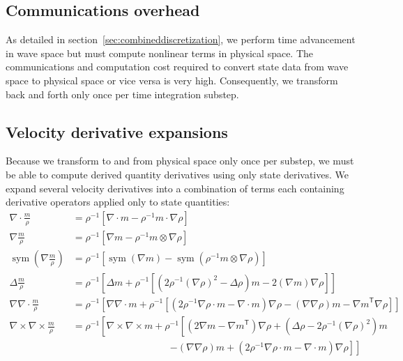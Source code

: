 \documentclass[letterpaper,11pt,nointlimits,reqno,draft]{amsart}
\newcommand{\trans}[1]{{#1}^{\ensuremath{\mathsf{T}}}}
\newcommand{\symmetricpart}[1]
  {\ensuremath{\operatorname{sym}\left(#1\right)}}
\begin{document}
\subsection{Communications overhead}
\label{sec:commoverhead}

As detailed in section~\ref{sec:combineddiscretization}, we perform time
advancement in wave space but must compute nonlinear terms in physical space.
The communications and computation cost required to convert state data from
wave space to physical space or vice versa is very high.  Consequently, we
transform back and forth only once per time integration substep.

\subsection{Velocity derivative expansions}
\label{velocity_derivative_expansions}

Because we transform to and from physical space only once per substep, we must
be able to compute derived quantity derivatives using only state derivatives.
We expand several velocity derivatives into a combination of terms each
containing derivative operators applied only to state quantities:
\begin{subequations}
\begin{align}
  \nabla\cdot\frac{m}{\rho}
  &=
  \rho^{-1}\left[ \nabla\cdot{}m - \rho^{-1}m\cdot\nabla\rho \right]
\\
  \nabla{}\frac{m}{\rho}
  &=
  \rho^{-1}\left[ \nabla{}m - \rho^{-1}{m}\otimes\nabla\rho  \right]
\\
  \symmetricpart{\nabla\frac{m}{\rho}}
  &=
  \rho^{-1}\left[
      \symmetricpart{\nabla{}m}
    - \symmetricpart{\rho^{-1}m\otimes\nabla\rho}
  \right]
\\
  \Delta\frac{m}{\rho}
  &=
 \rho^{-1}\left[
      \Delta{}m
    + \rho^{-1}\left[
          \left(
              2\rho^{-1}\left(\nabla\rho\right)^{2}
            - \Delta\rho
          \right) {m}
        - 2 \left(\nabla{}m\right)\nabla\rho
      \right]
 \right]
\\
  \nabla\nabla\cdot\frac{m}{\rho}
  &=
  \rho^{-1}\left[
        \nabla\nabla\cdot{}m
      + \rho^{-1}\left[
            \left(2\rho^{-1}\nabla\rho\cdot{}m-\nabla\cdot{}m\right)\nabla\rho
          - \left(\nabla\nabla\rho\right)m
          - \trans{\nabla{}m}\nabla\rho
        \right]
  \right]
\\
  \nabla\times\nabla\times\frac{m}{\rho}
  &=
  \rho^{-1}\left[
        \nabla\times\nabla\times{}{m}
      + \rho^{-1} \left[
            \left(2\nabla{}m - \trans{\nabla{}m} \right) \nabla\rho
          + \left(\Delta\rho - 2 \rho^{-1} \left(\nabla\rho\right)^2 \right) m
        \right.
  \right.
\\ %
  &\qquad\qquad\qquad\qquad\qquad
  \left.
      \left.
          - \left(\nabla\nabla\rho \right) m
          + \left(2\rho^{-1}\nabla\rho\cdot{}m-\nabla\cdot{}m\right)\nabla\rho
      \right]
  \right]
\end{align}
\end{subequations}
\end{document}
